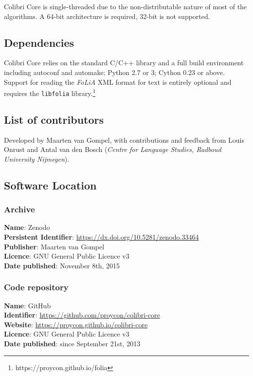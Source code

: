 \documentclass[a4paper,12pt]{article}
\begin{document}
Colibri Core is single-threaded due to the non-distributable nature of most of the
algorithms. A 64-bit architecture is required, 32-bit is not supported.

\subsection{Dependencies}

Colibri Core relies on the standard C/C++ library and a full build environment including autoconf and
automake; Python 2.7 or 3; Cython 0.23 or above. Support for reading the
\emph{FoLiA} XML format for text is entirely optional and requires the \texttt{libfolia}
library.\footnote{https://proycon.github.io/folia}

\subsection{List of contributors}

Developed by Maarten van Gompel, with contributions and feedback from Louis
Onrust and Antal van den Bosch (\emph{Centre for Language Studies, Radboud
University Nijmegen}).

\subsection{Software Location}

\subsubsection{Archive}

\begin{addmargin}[2em]{2em}
\textbf{Name}: Zenodo \\
\textbf{Persistent Identifier}: \url{https://dx.doi.org/10.5281/zenodo.33464} \\
\textbf{Publisher}: Maarten van Gompel \\
\textbf{Licence}: GNU General Public Licence v3 \\
\textbf{Date published}: November 8th, 2015 \\
\end{addmargin}

\subsubsection{Code repository}

\begin{addmargin}[2em]{2em}
\textbf{Name}: GitHub \\
\textbf{Identifier}: \url{https://github.com/proycon/colibri-core} \\
\textbf{Website}: \url{https://proycon.github.io/colibri-core} \\
\textbf{Licence}: GNU General Public Licence v3 \\
\textbf{Date published}: since September 21st, 2013 \\
\end{addmargin}
\end{document}
